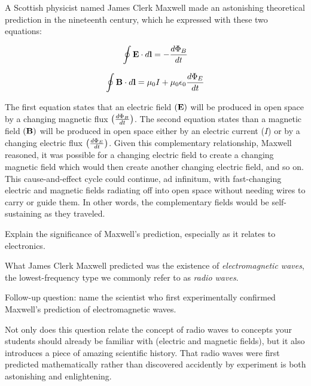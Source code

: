 

A Scottish physicist named James Clerk Maxwell made an astonishing theoretical prediction in the nineteenth century, which he expressed with these two equations:

$$\oint {\bf E} \cdot d{\bf l} = - {d \Phi_B \over dt}$$

$$\oint {\bf B} \cdot d{\bf l} = \mu_0 I + \mu_0 \epsilon_0 {d \Phi_E \over dt}$$

The first equation states that an electric field $({\bf E})$ will be produced in open space by a changing magnetic flux $\left({d \Phi_B \over dt}\right)$.  The second equation states than a magnetic field $({\bf B})$ will be produced in open space either by an electric current ($I$) or by a changing electric flux $\left({d \Phi_E \over dt}\right)$.  Given this complementary relationship, Maxwell reasoned, it was possible for a changing electric field to create a changing magnetic field which would then create another changing electric field, and so on.  This cause-and-effect cycle could continue, ad infinitum, with fast-changing electric and magnetic fields radiating off into open space without needing wires to carry or guide them.  In other words, the complementary fields would be self-sustaining as they traveled.

\vskip 10pt

Explain the significance of Maxwell's prediction, especially as it relates to electronics.







What James Clerk Maxwell predicted was the existence of {\it electromagnetic waves}, the lowest-frequency type we commonly refer to as {\it radio waves}.

\vskip 10pt

Follow-up question: name the scientist who first experimentally confirmed Maxwell's prediction of electromagnetic waves.







Not only does this question relate the concept of radio waves to concepts your students should already be familiar with (electric and magnetic fields), but it also introduces a piece of amazing scientific history.  That radio waves were first predicted mathematically rather than discovered accidently by experiment is both astonishing and enlightening.

